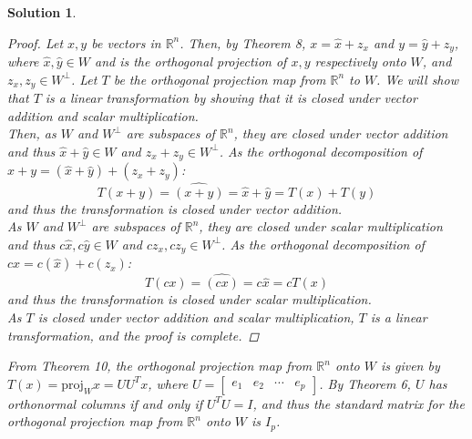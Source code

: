 \documentclass[11pt]{scrartcl}
\theoremstyle{dotlessP}
\newtheorem{sol}{Solution}[section]
\theoremstyle{dotlessN}
\newcommand{\reals}{\mathbb{R}} %
\newcommand{\proj}[2]{\text{proj}_{#1}{#2}}
\begin{document}
\begin{sol}
	\begin{proof}
		Let $x,y$ be vectors in $\reals^n$. Then, by Theorem 8, $x = \hat{x} + z_x$ and  $y = \hat{y} + z_y$, where  $\hat{x}, \hat{y} \in W$ and is the orthogonal projection of $x,y$ respectively onto $W$, and $z_x, z_y \in W^\perp$. Let $T$ be the orthogonal projection map from $\reals^n$ to $W$. We will show that $T$ is a linear transformation by showing that it is closed under vector addition and scalar multiplication.
\\

		Then, as $W$ and $W^\perp$ are subspaces of $\reals^n$, they are closed under vector addition and thus $\hat{x} + \hat{y} \in W$ and  $z_x + z_y \in W^\perp$. As the orthogonal decomposition of $x + y = (\hat{x} + \hat{y}) + (z_x + z_y)$:
		\[
			T(x+y) = \hat{(x+y)} = \hat{x} + \hat{y} = T(x) + T(y)
		\] 
		and thus the transformation is closed under vector addition.
		\\

		As $W$ and $W^\perp$ are subspaces of $\reals^n$, they are closed under scalar multiplication and thus $c\hat{x}, c\hat{y} \in W$ and $cz_x, cz_y \in W^\perp$. As the orthogonal decomposition of $cx = c(\hat{x}) + c(z_x)$:
		\[
			T(cx) = \hat{(cx)} = c\hat{x} = cT(x)
		\] 
		and thus the transformation is closed under scalar multiplication.
		\\

		As $T$ is closed under vector addition and scalar multiplication, $T$ is a linear transformation, and the proof is complete.
	\end{proof}
	From Theorem 10, the orthogonal projection map from $\reals^n$ onto $W$ is given by $T(x) = \proj{W}{x} = UU^Tx
	$, where $U = 
\begin{bmatrix}
	e_1 & e_2 & \cdots & e_p
\end{bmatrix}
	$. By Theorem 6, $U$ has orthonormal columns if and only if $U^TU = I$, and thus the standard matrix for the orthogonal projection map from $\reals^n$ onto $W$ is $I_p$.
\end{sol}
\end{document}
